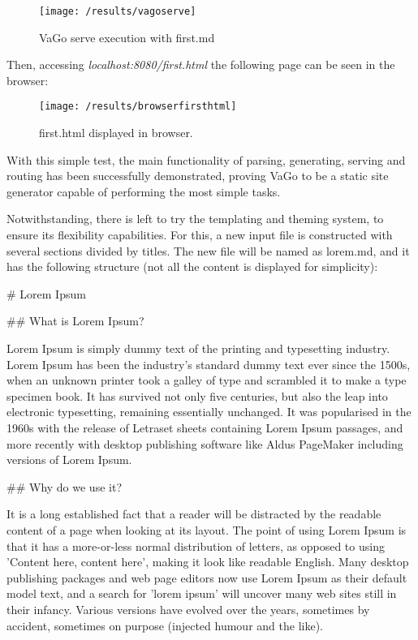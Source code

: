 \begin{figure}
    \centering
    \texttt{[image: /results/vagoserve]}
    \caption{VaGo serve execution with first.md}
    \label{fig:serve}
\end{figure}


Then, accessing \emph{localhost:8080/first.html} the following page can be seen in the browser:

\begin{figure}
    \centering
    \texttt{[image: /results/browserfirsthtml]}
    \caption{first.html displayed in browser.}
    \label{fig:browserfirst}
\end{figure}

With this simple test, the main functionality of parsing, generating, serving and routing has been successfully
demonstrated, proving VaGo to be a static site generator capable of performing the most simple tasks.

Notwithstanding, there is left to try the templating and theming system, to ensure its flexibility capabilities.
For this, a new input file is constructed with several sections divided by titles.
The new file will be named as lorem.md, and it has the following structure (not all the content is displayed for
simplicity):

\begin{code}

    # Lorem Ipsum

    ## What is Lorem Ipsum?

    Lorem Ipsum is simply dummy text of the printing and
    typesetting industry. Lorem Ipsum has been the industry's
    standard    dummy text ever since the 1500s, when an
    unknown printer took a galley of type and scrambled it
    to make a type specimen book. It has survived not only
    five centuries, but also the leap into electronic
    typesetting, remaining essentially unchanged. It was
    popularised in the 1960s with the release of Letraset
    sheets containing Lorem Ipsum passages, and more
    recently with desktop publishing software like Aldus
    PageMaker including versions of Lorem Ipsum.

    ## Why do we use it?

    It is a long established fact that a reader will be
    distracted by the readable content of a page when
    looking at its layout. The point of using Lorem
    Ipsum is that it has a more-or-less normal
    distribution of letters, as opposed to using
    'Content here, content here', making it look like
    readable English. Many desktop publishing packages
    and web page editors now use Lorem Ipsum as their
    default model text, and a search for 'lorem ipsum'
    will uncover many web sites still in their infancy.
    Various versions have evolved over the years,
    sometimes by accident, sometimes on purpose
    (injected humour and the like).

\end{code}

